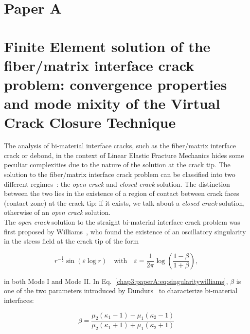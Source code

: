 \section{Paper A}
\section*{Finite Element solution of the fiber/matrix interface crack problem: convergence properties and mode mixity of the Virtual Crack Closure Technique}

The analysis of bi-material interface cracks, such as the fiber/matrix interface crack or debond, in the context of Linear Elastic Fracture Mechanics hides some peculiar complexities due to the nature of the solution at the crack tip. The solution to the fiber/matrix interface crack problem can be classified into two different regimes~\cite{Paris1996,Varna1997a}: the \emph{open crack} and \emph{closed crack} solution. The distinction between the two lies in the existence of a region of contact between crack faces (contact zone) at the crack tip: if it exists, we talk about a \emph{closed crack} solution, otherwise of an \emph{open crack} solution.\\
The \emph{open crack} solution to the straight bi-material interface crack problem was first proposed by Williams~\cite{Williams1959}, who found the existence of an oscillatory singularity in the stress field at the crack tip of the form

\begin{equation}\label{chap3:paperA:eq:singularitywilliams}
r^{-\frac{1}{2}}\sin\left(\varepsilon\log r\right)\quad\text{with}\quad\varepsilon=\frac{1}{2\pi}\log\left(\frac{1-\beta}{1+\beta}\right),
\end{equation}

in both Mode I and Mode II. In Eq.~\ref{chap3:paperA:eq:singularitywilliams}, $\beta$ is one of the two parameters introduced by Dundurs~\cite{Dundurs1969} to characterize bi-material interfaces:

\begin{equation}\label{chap3:paperA:eq:dundursbeta}
\beta=\frac{\mu_{2}\left(\kappa_{1}-1\right)-\mu_{1}\left(\kappa_{2}-1\right)}{\mu_{2}\left(\kappa_{1}+1\right)+\mu_{1}\left(\kappa_{2}+1\right)}
\end{equation}

